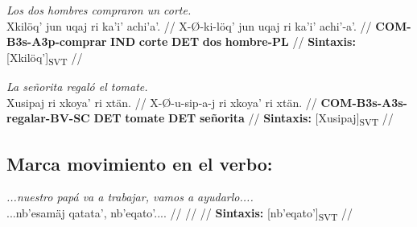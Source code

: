 \documentclass{article}%
\begin{document}
%
\par\medskip%
\ex
\textit{Los dos hombres compraron un corte.} \\
\begingl
\gla Xkilöq' jun uqaj ri ka'i' achi'a'. //
\glb X-Ø-ki-löq' jun uqaj ri ka'i' achi'-a'. //
\glc \textbf{COM-}\textbf{B3s-}\textbf{A3p-}\textbf{comprar} \textbf{IND} \textbf{corte} \textbf{DET} \textbf{dos} \textbf{hombre-}\textbf{PL} //
\glft \textbf{Sintaxis:} [Xkilöq']\textsubscript{SVT} //
\endgl
\xe
%
\medskip%
\par\medskip%
\ex
\textit{La señorita regaló el tomate.} \\
\begingl
\gla Xusipaj ri xkoya' ri xtän. //
\glb X-Ø-u-sip-a-j ri xkoya' ri xtän. //
\glc \textbf{COM-}\textbf{B3s-}\textbf{A3s-}\textbf{regalar-}\textbf{BV-}\textbf{SC} \textbf{DET} \textbf{tomate} \textbf{DET} \textbf{señorita} //
\glft \textbf{Sintaxis:} [Xusipaj]\textsubscript{SVT} //
\endgl
\xe
%
\medskip%
\subsection{Marca movimiento en el verbo:}%
\label{subsec:Marcamovimientoenelverbo}%

%
\par\medskip%
\ex
\textit{...nuestro papá va a trabajar, vamos a ayudarlo....} \\
\begingl
\gla ...nb'esamäj qatata', nb'eqato'.... //
\glb  //
\glc  //
\glft \textbf{Sintaxis:} [nb'eqato']\textsubscript{SVT} //
\endgl
\xe
%
\medskip

%
\end{document}
